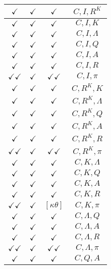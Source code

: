 \documentclass[a4paper,10pt]{article}
\begin{document}
\begin{longtable}{|c|c|c|c|}
\hline
$\checkmark$ & $\checkmark$ & $\checkmark$ & ${C},{I},{R^{K}}$ \\
\hline
$\checkmark$ & $\checkmark$ & $\checkmark$ & ${C},{I},{K}$ \\
\hline
$\checkmark$ & $\checkmark$ & $\checkmark$ & ${C},{I},{\Lambda}$ \\
\hline
$\checkmark$ & $\checkmark$ & $\checkmark$ & ${C},{I},{Q}$ \\
\hline
$\checkmark$ & $\checkmark$ & $\checkmark$ & ${C},{I},{A}$ \\
\hline
$\checkmark$ & $\checkmark$ & $\checkmark$ & ${C},{I},{R}$ \\
\hline
$\checkmark\checkmark$ & $\checkmark$ & $\checkmark\checkmark$ & ${C},{I},{\pi}$ \\
\hline
$\checkmark$ & $\checkmark$ & $\checkmark$ & ${C},{R^{K}},{K}$ \\
\hline
$\checkmark$ & $\checkmark$ & $\checkmark$ & ${C},{R^{K}},{\Lambda}$ \\
\hline
$\checkmark$ & $\checkmark$ & $\checkmark$ & ${C},{R^{K}},{Q}$ \\
\hline
$\checkmark$ & $\checkmark$ & $\checkmark$ & ${C},{R^{K}},{A}$ \\
\hline
$\checkmark$ & $\checkmark$ & $\checkmark$ & ${C},{R^{K}},{R}$ \\
\hline
$\checkmark\checkmark$ & $\checkmark$ & $\checkmark\checkmark$ & ${C},{R^{K}},{\pi}$ \\
\hline
$\checkmark$ & $\checkmark$ & $\checkmark$ & ${C},{K},{\Lambda}$ \\
\hline
$\checkmark$ & $\checkmark$ & $\checkmark$ & ${C},{K},{Q}$ \\
\hline
$\checkmark$ & $\checkmark$ & $\checkmark$ & ${C},{K},{A}$ \\
\hline
$\checkmark$ & $\checkmark$ & $\checkmark$ & ${C},{K},{R}$ \\
\hline
$\checkmark\checkmark$ & $\checkmark$ & $[\kappa \theta ]$ & ${C},{K},{\pi}$ \\
\hline
$\checkmark$ & $\checkmark$ & $\checkmark$ & ${C},{\Lambda},{Q}$ \\
\hline
$\checkmark$ & $\checkmark$ & $\checkmark$ & ${C},{\Lambda},{A}$ \\
\hline
$\checkmark$ & $\checkmark$ & $\checkmark$ & ${C},{\Lambda},{R}$ \\
\hline
$\checkmark\checkmark$ & $\checkmark$ & $\checkmark\checkmark$ & ${C},{\Lambda},{\pi}$ \\
\hline
$\checkmark$ & $\checkmark$ & $\checkmark$ & ${C},{Q},{A}$ \\

\end{longtable}
\end{document}
